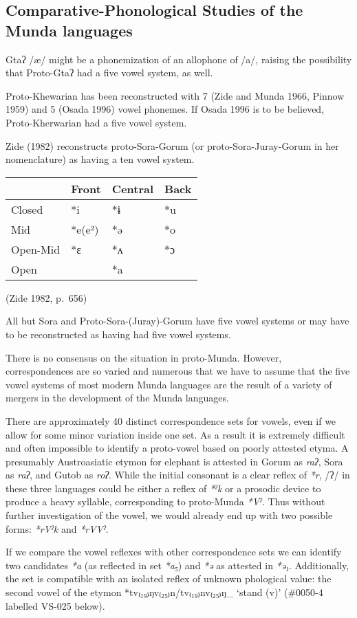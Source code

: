 \documentclass[a4paper,]{article}
\begin{document}
\subsection{Comparative-Phonological Studies of the Munda
languages}\label{comparative-phonological-studies-of-the-munda-languages}

Gtaʔ /æ/ might be a phonemization of an allophone of /a/, raising the
possibility that Proto-Gtaʔ had a five vowel system, as well.

Proto-Khewarian has been reconstructed with 7 (Zide and Munda 1966,
Pinnow 1959) and 5 (Osada 1996) vowel phonemes. If Osada 1996 is to be
believed, Proto-Kherwarian had a five vowel system.

Zide (1982) reconstructs proto-Sora-Gorum (or proto-Sora-Juray-Gorum in
her nomenclature) as having a ten vowel system.

\begin{longtable}[]{@{}llll@{}}
\toprule
& Front & Central & Back\tabularnewline
\midrule
\endhead
Closed & *i & *ɨ & *u\tabularnewline
Mid & *e(e²) & *ə & *o\tabularnewline
Open-Mid & *ɛ & *ʌ & *ɔ\tabularnewline
Open & & *a &\tabularnewline
\bottomrule
\end{longtable}

(Zide 1982, p.~656)

All but Sora and Proto-Sora-(Juray)-Gorum have five vowel systems or may
have to be reconstructed as having had five vowel systems.

There is no consensus on the situation in proto-Munda. However,
correspondences are so varied and numerous that we have to assume that
the five vowel systems of most modern Munda languages are the result of
a variety of mergers in the development of the Munda languages.

There are approximately 40 distinct correspondence sets for vowels, even
if we allow for some minor variation inside one set. As a result it is
extremely difficult and often impossible to identify a proto-vowel based
on poorly attested etyma. A presumably Austroasiatic etymon for elephant
is attested in Gorum as \emph{raʔ}, Sora as \emph{raʔ}, and Gutob as
\emph{roʔ}. While the initial consonant is a clear reflex of \emph{*r},
/ʔ/ in these three languages could be either a reflex of \emph{*ˀk} or a
prosodic device to produce a heavy syllable, corresponding to
proto-Munda \emph{*Vˀ}. Thus without further investigation of the vowel,
we would already end up with two possible forms: \emph{*rVˀk} and
\emph{*rVVˀ}.

If we compare the vowel reflexes with other correspondence sets we can
identify two candidates \emph{*a} (as reflected in set \emph{*a₅}) and
\emph{*ə} as attested in \emph{*ə₁}. Additionally, the set is compatible
with an isolated reflex of unknown phological value: the second vowel of
the etymon *tv₍₁₉₎ŋv₍₂₅₎n/tv₍₁₉₎nv₍₂₅₎ŋ\_ `stand (v)' (\#0050-4 labelled
VS-025 below).
\end{document}
